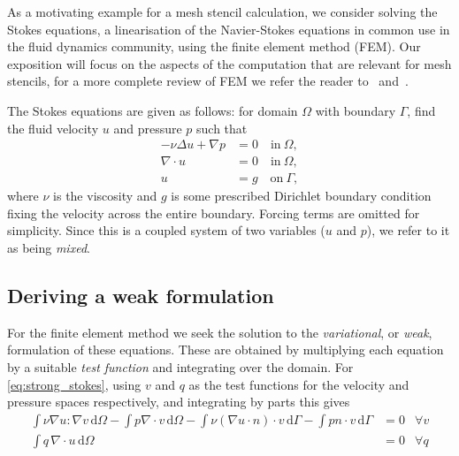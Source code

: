\documentclass[thesis]{subfiles}
\begin{document}
As a motivating example for a mesh stencil calculation, we consider solving the Stokes equations, a linearisation of the Navier-Stokes equations in common use in the fluid dynamics community, using the finite element method (FEM).
Our exposition will focus on the aspects of the computation that are relevant for mesh stencils, for a more complete review of FEM we refer the reader to~\cite{brennerMathematicalTheoryFinite2008} and~\cite{larsonFiniteElementMethod2013}.

The Stokes equations are given as follows: for domain $\Omega$ with boundary $\Gamma$, find the fluid velocity $u$ and pressure $p$ such that
\begin{equation} \label{eq:strong_stokes}
  \begin{aligned}
    - \nu \Delta u + \nabla p &= 0 \quad \textrm{in} \ \Omega, \\
    \nabla \cdot u &= 0 \quad \textrm{in} \ \Omega, \\
    u &= g \quad \textrm{on} \ \Gamma,
  \end{aligned}
\end{equation}
where $\nu$ is the viscosity and $g$ is some prescribed Dirichlet boundary condition fixing the velocity across the entire boundary.
Forcing terms are omitted for simplicity.
Since this is a coupled system of two variables ($u$ and $p$), we refer to it as being \emph{mixed}.

\subsection{Deriving a weak formulation}

For the finite element method we seek the solution to the \emph{variational}, or \emph{weak}, formulation of these equations.
These are obtained by multiplying each equation by a suitable \emph{test function} and integrating over the domain.
For \cref{eq:strong_stokes}, using $v$ and $q$ as the test functions for the velocity and pressure spaces respectively, and integrating by parts this gives
\begin{equation} \label{eq:weak_stokes_full}
  \begin{aligned}
    \int \nu \nabla u : \nabla v \, \textrm{d}\Omega
    - \int p \nabla \cdot v \, \textrm{d}\Omega
    - \int \nu (\nabla u \cdot n) \cdot v \, \textrm{d}\Gamma
    - \int p n \cdot v \, \textrm{d}\Gamma
    &= 0
    &\forall v
    \\
    \int q \, \nabla \cdot u \, \textrm{d}\Omega
    &= 0
    &\forall q
  \end{aligned}
\end{equation}
\end{document}
